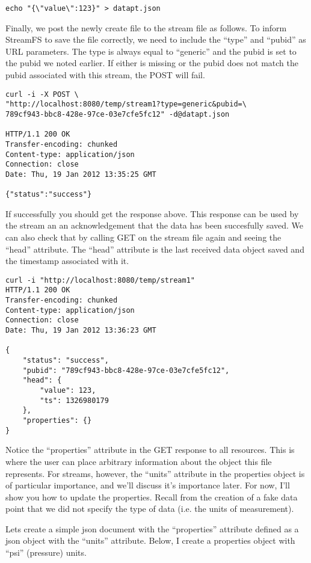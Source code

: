 \begin{lstlisting}
echo "{\"value\":123}" > datapt.json
\end{lstlisting}

Finally, we post the newly create file to the stream file as follows. To inform StreamFS to save the file correctly, we need to include the ``type'' and ``pubid'' as URL parameters. The type is always equal to ``generic'' and the pubid is set to the pubid we noted earlier. If either is missing or the pubid does not match the pubid associated with this stream, the POST will fail.

\begin{lstlisting}
curl -i -X POST \
"http://localhost:8080/temp/stream1?type=generic&pubid=\
789cf943-bbc8-428e-97ce-03e7cfe5fc12" -d@datapt.json

HTTP/1.1 200 OK
Transfer-encoding: chunked
Content-type: application/json
Connection: close
Date: Thu, 19 Jan 2012 13:35:25 GMT

{"status":"success"}
\end{lstlisting}

If successfully you should get the response above. This response can be used by the stream an an acknowledgement that the data has been succesfully saved. We can also check that by calling GET on the stream file again and seeing the ``head'' attribute. The ``head'' attribute is the last received data object saved and the timestamp associated with it.

\begin{lstlisting}
curl -i "http://localhost:8080/temp/stream1"
HTTP/1.1 200 OK
Transfer-encoding: chunked
Content-type: application/json
Connection: close
Date: Thu, 19 Jan 2012 13:36:23 GMT

{
    "status": "success",
    "pubid": "789cf943-bbc8-428e-97ce-03e7cfe5fc12",
    "head": {
        "value": 123,
        "ts": 1326980179
    },
    "properties": {}
}
\end{lstlisting}

Notice the ``properties'' attribute in the GET response to all resources. This is where the user can place arbitrary information about the object this file represents. For streams, however, the ``units'' attribute in the properties object is of particular importance, and we'll discuss it's importance later. For now, I'll show you how to update the properties. Recall from the creation of a fake data point that we did not specify the type of data (i.e. the units of measurement).

Lets create a simple json document with the ``properties'' attribute defined as a json object with the ``units'' attribute. Below, I create a properties object with ``psi'' (pressure) units.

